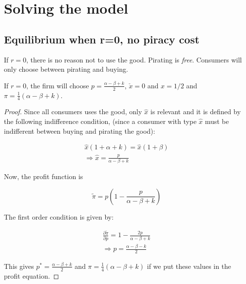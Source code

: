\section{Solving the model}


\subsection{Equilibrium when r=0, no piracy cost}

If $r=0$, there is no reason not to use the good. Pirating is \textit{free}. Consumers will only choose between pirating and buying. 

\begin{proposition}
If $r=0$, the firm will choose $p=\frac{\alpha-\beta+k}{2}$, $\check{x}=0$ and $\hat{x}=1/2$ and $\pi= \frac{1}{4}(\alpha-\beta+k)$.
\end{proposition}

\begin{proof}

Since all consumers uses the good, only $\hat{x}$ is relevant and it is defined by the following indifference condition, (since a consumer with type $\hat{x}$ must be indifferent between buying and pirating the good):

\begin{align*}
\hat{x}(1+\alpha+k)=\hat{x}(1+\beta) \\
\Rightarrow \hat{x} = \frac{p}{\alpha - \beta +k}
\end{align*}


Now, the profit function is

\begin{equation*}
\tilde{\pi} = p\left(1-\frac{p}{\alpha - \beta +k}\right)
\end{equation*}

The first order condition is given by:

\begin{align*}
\frac{\partial \tilde{\pi}}{\partial p}= 1-\frac{2p}{\alpha - \beta +k}\\
\Rightarrow p = \frac{\alpha-\beta-k}{2}
\end{align*} 

This gives  $p^*=\frac{\alpha-\beta+k}{2}$ and $\pi=\frac{1}{4}(\alpha-\beta+k)$ if we put these values in the profit equation. 

\end{proof}


